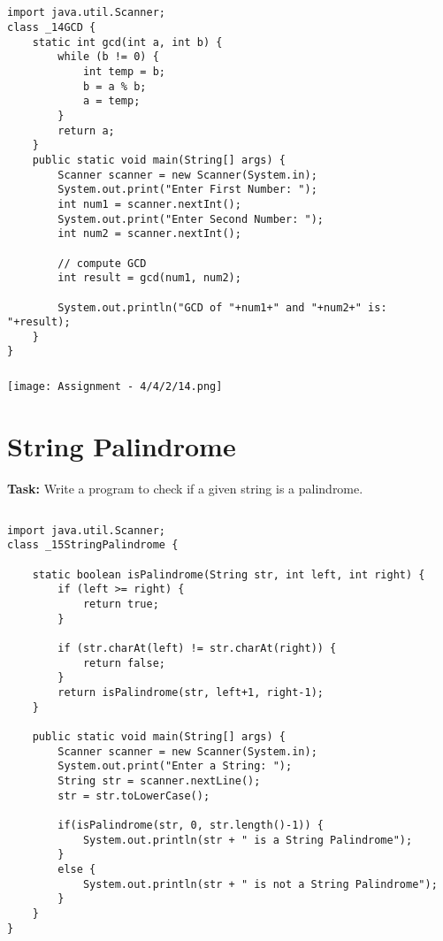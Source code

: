 \documentclass[12pt,a4paper]{article}
\begin{document}
\subsection{}
\begin{lstlisting}
import java.util.Scanner;
class _14GCD {
    static int gcd(int a, int b) {
        while (b != 0) {
            int temp = b;
            b = a % b;
            a = temp;
        }
        return a;
    }
    public static void main(String[] args) {
        Scanner scanner = new Scanner(System.in);
        System.out.print("Enter First Number: ");
        int num1 = scanner.nextInt();
        System.out.print("Enter Second Number: ");
        int num2 = scanner.nextInt();
    
        // compute GCD
        int result = gcd(num1, num2);
    
        System.out.println("GCD of "+num1+" and "+num2+" is: "+result);
    }
}
\end{lstlisting}

\subsubsection{}
\begin{center}
    \texttt{[image: Assignment - 4/4/2/14.png]}
\end{center}


\section{String Palindrome}
\textbf{Task:} Write a program to check if a given string is a palindrome.

\subsection{}
\begin{lstlisting}
import java.util.Scanner;
class _15StringPalindrome {

    static boolean isPalindrome(String str, int left, int right) {
        if (left >= right) {
            return true;
        }
    
        if (str.charAt(left) != str.charAt(right)) {
            return false;
        }
        return isPalindrome(str, left+1, right-1);
    }
    
    public static void main(String[] args) {
        Scanner scanner = new Scanner(System.in);
        System.out.print("Enter a String: ");
        String str = scanner.nextLine();
        str = str.toLowerCase();
    
        if(isPalindrome(str, 0, str.length()-1)) {
            System.out.println(str + " is a String Palindrome");
        }
        else {
            System.out.println(str + " is not a String Palindrome");
        }
    }
}
\end{lstlisting}
\end{document}
